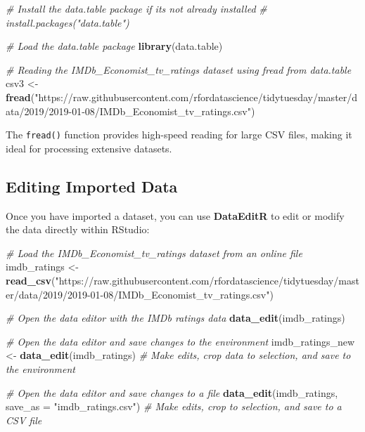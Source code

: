 \documentclass[
]{book}
\newenvironment{Shaded}{\begin{snugshade}}{\end{snugshade}}
\newcommand{\AttributeTok}[1]{\textcolor[rgb]{0.13,0.29,0.53}{#1}}
\newcommand{\CommentTok}[1]{\textcolor[rgb]{0.56,0.35,0.01}{\textit{#1}}}
\newcommand{\FunctionTok}[1]{\textcolor[rgb]{0.13,0.29,0.53}{\textbf{#1}}}
\newcommand{\NormalTok}[1]{#1}
\newcommand{\OtherTok}[1]{\textcolor[rgb]{0.56,0.35,0.01}{#1}}
\newcommand{\StringTok}[1]{\textcolor[rgb]{0.31,0.60,0.02}{#1}}
\begin{document}
\begin{Shaded}
\begin{Highlighting}[]
\CommentTok{\# Install the data.table package if it\textquotesingle{}s not already installed}
\CommentTok{\# install.packages("data.table")}

\CommentTok{\# Load the data.table package}
\FunctionTok{library}\NormalTok{(data.table)}

\CommentTok{\# Reading the IMDb\_Economist\_tv\_ratings dataset using fread from data.table}
\NormalTok{csv3 }\OtherTok{\textless{}{-}} \FunctionTok{fread}\NormalTok{(}\StringTok{"https://raw.githubusercontent.com/rfordatascience/tidytuesday/master/data/2019/2019{-}01{-}08/IMDb\_Economist\_tv\_ratings.csv"}\NormalTok{)}
\end{Highlighting}
\end{Shaded}

The \texttt{fread()} function provides high-speed reading for large CSV files, making it ideal for processing extensive datasets.

\subsection*{Editing Imported Data}\label{editing-imported-data}

Once you have imported a dataset, you can use \textbf{DataEditR} to edit or modify the data directly within RStudio:

\begin{Shaded}
\begin{Highlighting}[]
\CommentTok{\# Load the IMDb\_Economist\_tv\_ratings dataset from an online file}
\NormalTok{imdb\_ratings }\OtherTok{\textless{}{-}} \FunctionTok{read\_csv}\NormalTok{(}\StringTok{"https://raw.githubusercontent.com/rfordatascience/tidytuesday/master/data/2019/2019{-}01{-}08/IMDb\_Economist\_tv\_ratings.csv"}\NormalTok{)}
\end{Highlighting}
\end{Shaded}

\begin{Shaded}
\begin{Highlighting}[]
\CommentTok{\# Open the data editor with the IMDb ratings data}
\FunctionTok{data\_edit}\NormalTok{(imdb\_ratings)}

\CommentTok{\# Open the data editor and save changes to the environment}
\NormalTok{imdb\_ratings\_new }\OtherTok{\textless{}{-}} \FunctionTok{data\_edit}\NormalTok{(imdb\_ratings)  }\CommentTok{\# Make edits, crop data to selection, and save to the environment}

\CommentTok{\# Open the data editor and save changes to a file}
\FunctionTok{data\_edit}\NormalTok{(imdb\_ratings, }\AttributeTok{save\_as =} \StringTok{"imdb\_ratings.csv"}\NormalTok{)  }\CommentTok{\# Make edits, crop to selection, and save to a CSV file}
\end{Highlighting}
\end{Shaded}
\end{document}
